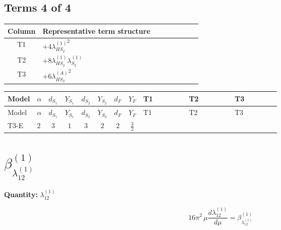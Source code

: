 \documentclass[8pt]{article}
\begin{document}
\begin{landscape}
\subsection*{Terms 4 of 4}
\begin{center}
\begin{tabular}{@{}c >{\raggedright\arraybackslash}p{0.82\linewidth}@{}}
\toprule
Column & Representative term structure \\
\midrule
T1 & \(\displaystyle +4 {\lambda_{HS_2}^{(1)}}^2\) \\
\midrule
T2 & \(\displaystyle +8 {\lambda_{HS_2}^{(1)}} {\lambda_{S_2}^{(1)}}\) \\
\midrule
T3 & \(\displaystyle +6 {\lambda_{HS_2}^{(A)}}^2\) \\
\midrule
\bottomrule
\end{tabular}
\end{center}
\smallskip
\tiny
\begin{longtable}{@{}llcccccc >{\raggedright\arraybackslash}p{0.21\linewidth} >{\raggedright\arraybackslash}p{0.21\linewidth} >{\raggedright\arraybackslash}p{0.21\linewidth}@{}}
\toprule
Model & $\alpha$ & $d_{S_1}$ & $Y_{S_1}$ & $d_{S_2}$ & $Y_{S_2}$ & $d_F$ & $Y_F$ & T1 & T2 & T3 \\
\midrule
\endfirsthead
\toprule
Model & $\alpha$ & $d_{S_1}$ & $Y_{S_1}$ & $d_{S_2}$ & $Y_{S_2}$ & $d_F$ & $Y_F$ & T1 & T2 & T3 \\
\midrule
\endhead
T3-E & $2$ & $3$ & $1$ & $3$ & $2$ & $2$ & $\frac{3}{2}$ & \scriptsize\adjustbox{max width=\linewidth}{$\begin{gathered} +4 {\lambda_{HS_2}^{(1)}}^2\end{gathered}$} & \scriptsize\adjustbox{max width=\linewidth}{$\begin{gathered} +8 {\lambda_{HS_2}^{(1)}} {\lambda_{S_2}^{(1)}}\end{gathered}$} & \scriptsize\adjustbox{max width=\linewidth}{$\begin{gathered} +6 {\lambda_{HS_2}^{(A)}}^2\end{gathered}$} \\
\midrule
\bottomrule
\end{longtable}
\clearpage
\section*{$\beta_{\lambda_{12}^{(1)}}^{(1)}$}
\noindent\textbf{Quantity: }$\lambda_{12}^{(1)}$\par\smallskip
\[16\pi^2\,\mu\frac{d \lambda_{12}^{(1)}}{d\mu}=\beta_{\lambda_{12}^{(1)}}^{(1)}\]

\end{landscape}
\end{document}
